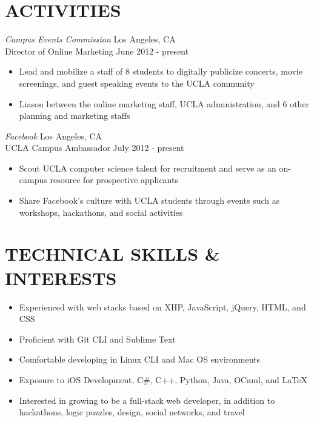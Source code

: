\documentclass{res}
\begin{document}
\begin{resume}
\section{ACTIVITIES}
\vspace{6pt}
  {\sl Campus Events Commission} \hfill Los Angeles, CA \\
  Director of Online Marketing \hfill June 2012 - present
  \begin{itemize} \itemsep -2pt
    \item Lead and mobilize a staff of 8 students to digitally publicize concerts, movie screenings, and guest speaking events to the UCLA community
    \item Liason between the online marketing staff, UCLA administration, and 6 other planning and marketing staffs
  \end{itemize} \vspace{-8pt}

  {\sl Facebook} \hfill Los Angeles, CA \\
  UCLA Campus Ambassador \hfill July 2012 - present
  \begin{itemize} \itemsep -2pt
    \item Scout UCLA computer science talent for recruitment and serve as an on-campus resource for prospective applicants
    \item Share Facebook's culture with UCLA students through events such as workshops,  hackathons, and social activities
  \end{itemize} \vspace{-6pt}

\section{TECHNICAL SKILLS \& INTERESTS}
\vspace{0.2in}
  \begin{itemize}  \itemsep -2pt
    \item Experienced with web stacks based on XHP, JavaScript, jQuery, HTML, and CSS
    \item Proficient with Git CLI and Sublime Text
    \item Comfortable developing in Linux CLI and Mac OS environments
    \item Exposure to iOS Development, C\#, C++, Python, Java, OCaml, and LaTeX
    \item Interested in growing to be a full-stack web developer, in addition to hackathons, logic puzzles, design, social networks, and travel

  \end{itemize}
\end{resume}
\end{document}
